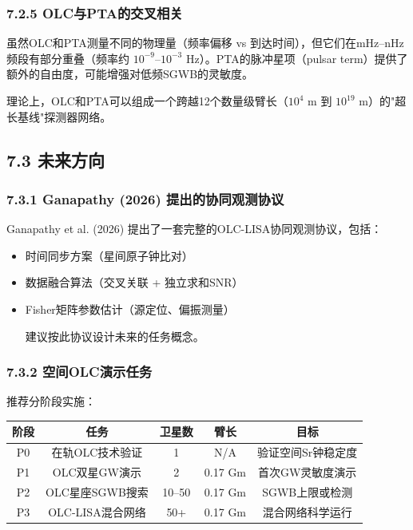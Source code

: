 \documentclass[12pt,a4paper]{article}
\begin{document}
\subsubsection{7.2.5 OLC与PTA的交叉相关}


虽然OLC和PTA测量不同的物理量（频率偏移 vs 到达时间），但它们在mHz–nHz频段有部分重叠（频率约 $10^{-9}$–$10^{-3}$ Hz）。PTA的脉冲星项（pulsar term）提供了额外的自由度，可能增强对低频SGWB的灵敏度。

理论上，OLC和PTA可以组成一个跨越12个数量级臂长（$10^4$ m 到 $10^{19}$ m）的"超长基线"探测器网络。

\subsection{7.3 未来方向}


\subsubsection{7.3.1 Ganapathy (2026) 提出的协同观测协议}


Ganapathy et al. (2026) 提出了一套完整的OLC-LISA协同观测协议，包括：
\begin{itemize}
  \item 时间同步方案（星间原子钟比对）
  \item 数据融合算法（交叉关联 + 独立求和SNR）
  \item Fisher矩阵参数估计（源定位、偏振测量）

建议按此协议设计未来的任务概念。

\end{itemize}
\subsubsection{7.3.2 空间OLC演示任务}


推荐分阶段实施：

\begin{tabular}{|c|c|c|c|c|}
\hline
阶段 & 任务 & 卫星数 & 臂长 & 目标 \\
\hline
P0 & 在轨OLC技术验证 & 1 & N/A & 验证空间Sr钟稳定度 \\
P1 & OLC双星GW演示 & 2 & 0.17 Gm & 首次GW灵敏度演示 \\
P2 & OLC星座SGWB搜索 & 10–50 & 0.17 Gm & SGWB上限或检测 \\
P3 & OLC-LISA混合网络 & 50+ & 0.17 Gm & 混合网络科学运行 \\
\hline
\end{tabular}
\end{document}
